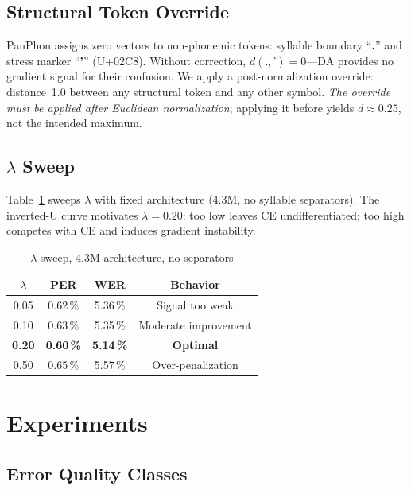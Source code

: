 \documentclass[conference]{IEEEtran}
\newcommand{\lam}{\lambda}                %
\begin{document}
\subsection{Structural Token Override}

PanPhon assigns zero vectors to non-phonemic tokens: syllable
boundary ``\textbf{.}'' and stress marker ``\textbf{'}'' (U+02C8).
Without correction, $d(., \text{'}) = 0$---DA provides no gradient
signal for their confusion.
We apply a post-normalization override: distance~1.0 between any
structural token and any other symbol.
\emph{The override must be applied after Euclidean normalization};
applying it before yields $d\!\approx\!0.25$, not the intended
maximum.

\subsection{$\lambda$ Sweep}

Table~\ref{tab:lambda} sweeps $\lam$ with fixed architecture (4.3M,
no syllable separators).
The inverted-U curve motivates $\lam\!=\!0.20$: too low leaves CE
undifferentiated; too high competes with CE and induces gradient
instability.

\begin{table}[t]
  \caption{$\lambda$ sweep, 4.3M architecture, no separators}
  \label{tab:lambda}
  \centering\small
  \begin{tabular}{cccc}
    \toprule
    $\lambda$ & PER & WER & Behavior \\
    \midrule
    0.05 & 0.62\,\% & 5.36\,\% & Signal too weak \\
    0.10 & 0.63\,\% & 5.35\,\% & Moderate improvement \\
    \textbf{0.20} & \textbf{0.60\,\%} & \textbf{5.14\,\%} & \textbf{Optimal} \\
    0.50 & 0.65\,\% & 5.57\,\% & Over-penalization \\
    \bottomrule
  \end{tabular}
\end{table}

\section{Experiments}
\label{sec:results}

\subsection{Error Quality Classes}
\end{document}
